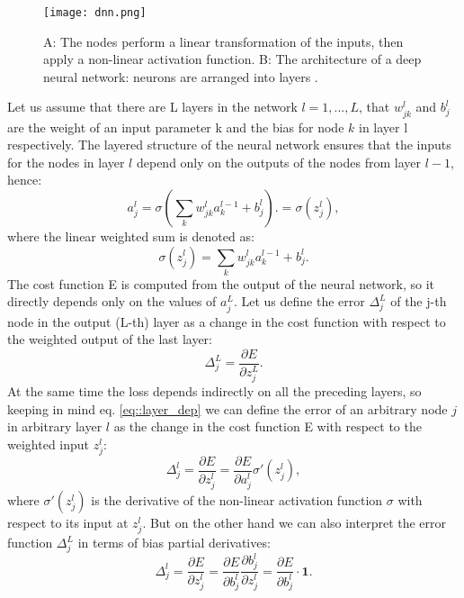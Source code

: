 \begin{figure}[htpb]
	\centering
	\texttt{[image: dnn.png]}
	\caption{A: The nodes perform a linear transformation of the inputs, then apply a non-linear activation function. B: The architecture of a deep neural network: neurons are arranged into layers \cite{dnn1}. }
	\label{fig::dnn}
\end{figure}
Let us assume that there are L layers in the network $l=1,...,L$, that $w^l_{jk}$ and $b^l_j$ are the weight of an input parameter k and the bias for node $k$ in layer l respectively. The layered structure of the neural network ensures that the inputs for the nodes in layer $l$ depend only on the outputs of the nodes from layer $l-1$, hence:
\begin{equation}
\label{eq::layer_dep}
a^l_j=\sigma\left(\sum_k w^l_{jk}a^{l-1}_k + b_j^l \right). = \sigma(z^l_j),
\end{equation}
where the linear weighted sum is denoted as:
\begin{equation}
\sigma(z^l_j)=\sum_k w^l_{jk}a^{l-1}_k + b_j^l.
\end{equation}
The cost function E is computed from the output of the neural network, so it directly depends only on the values of $a_j^L$. Let us define the error $\Delta_j^L$ of the j-th node in the output (L-th) layer as a change in the cost function with respect to the weighted output of the last layer:
\begin{equation}
\label{eq::bp1}
\Delta^L_j=\frac{\partial E}{\partial z_j^L}.
\end{equation}
At the same time the loss depends indirectly on all the preceding layers, so keeping in mind eq. \ref{eq::layer_dep} we can define the error of an arbitrary node $j$ in arbitrary layer $l$ as the change in the cost function E with respect to the weighted input $z^l_j$:
\begin{equation}
\Delta^l_j=\frac{\partial E}{\partial z_j^l}=\frac{\partial E}{\partial a^l_j}\sigma'(z^l_j),
\end{equation}
where $\sigma'(z^l_j)$ is the derivative of the non-linear activation function $\sigma$ with respect to its input at $z^l_j$. But on the other hand we can also interpret the error function  $\Delta^L_j$ in terms of bias partial derivatives:
\begin{equation}
\label{eq::bp2}
\Delta^l_j=\frac{\partial E}{\partial z_j^l}=\frac{\partial E}{\partial b^l_j}\frac{\partial b_j^l}{\partial z_j^l}=\frac{\partial E}{\partial b^l_j}\cdot \textbf{1}.
\end{equation}
